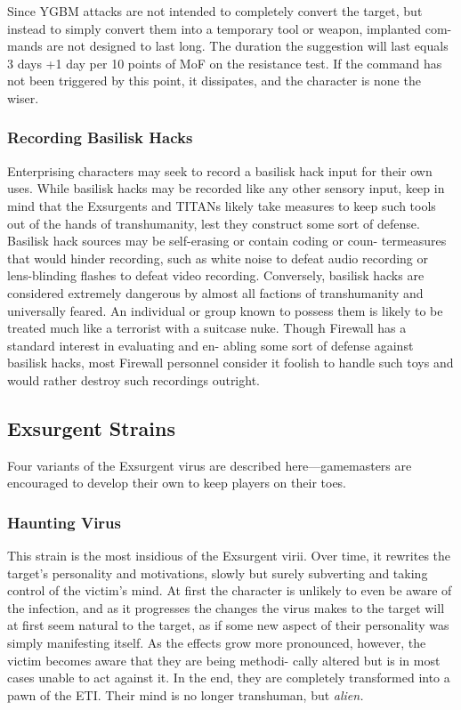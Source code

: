 Since YGBM attacks are not intended to completely 
convert the target, but instead to simply convert them 
into a temporary tool or weapon, implanted com-
mands are not designed to last long. The duration 
the suggestion will last equals 3 days +1 day per 10 
points of MoF on the resistance test. If the command 
has not been triggered by this point, it dissipates, and 
the character is none the wiser.

\subsubsection{Recording Basilisk Hacks}

Enterprising characters may seek to record a basilisk 
hack input for their own uses. While basilisk hacks may 
be recorded like any other sensory input, keep in mind 
that the Exsurgents and TITANs likely take measures 
to keep such tools out of the hands of transhumanity, 
lest they construct some sort of defense. Basilisk hack 
sources may be self-erasing or contain coding or coun-
termeasures that would hinder recording, such as white 
noise to defeat audio recording or lens-blinding flashes 
to defeat video recording. Conversely, basilisk hacks are 
considered extremely dangerous by almost all factions 
of transhumanity and universally feared. An individual 
or group known to possess them is likely to be treated 
much like a terrorist with a suitcase nuke. Though 
Firewall has a standard interest in evaluating and en-
abling some sort of defense against basilisk hacks, most 
Firewall personnel consider it foolish to handle such 
toys and would rather destroy such recordings outright.

\subsection{Exsurgent Strains}

Four variants of the Exsurgent virus are described 
here—gamemasters are encouraged to develop their 
own to keep players on their toes.

\subsubsection{Haunting Virus}

This strain is the most insidious of the Exsurgent virii. 
Over time, it rewrites the target's personality and 
motivations, slowly but surely subverting and taking 
control of the victim's mind. At first the character is 
unlikely to even be aware of the infection, and as it 
progresses the changes the virus makes to the target 
will at first seem natural to the target, as if some new 
aspect of their personality was simply manifesting 
itself. As the effects grow more pronounced, however, 
the victim becomes aware that they are being methodi-
cally altered but is in most cases unable to act against 
it. In the end, they are completely transformed into a 
pawn of the ETI. Their mind is no longer transhuman, 
but \textit{alien.}

